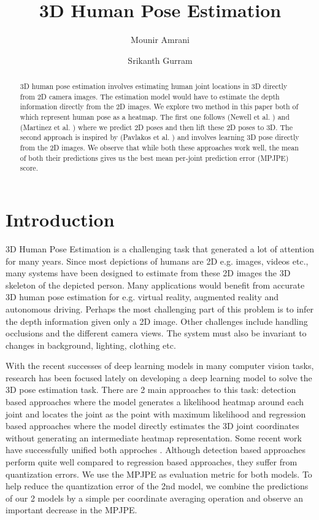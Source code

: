 \documentclass[sigconf]{acmart}
\begin{document}
\title{3D Human Pose Estimation}


\author{Mounir Amrani}\affiliation{}
\author{Srikanth Gurram}\affiliation{}

\begin{abstract}
3D human pose estimation involves estimating human joint locations in 3D directly from 2D camera images. The estimation model would have to estimate the depth information directly from the 2D images. We explore two method in this paper both of which represent human pose as a heatmap. The first one follows (Newell et al. \cite{newell}) and (Martinez et al. \cite{martinez}) where we predict 2D poses and then lift these 2D poses to 3D. The second approach is inspired by (Pavlakos et al. \cite{pavlakos}) and involves learning 3D pose directly from the 2D images. We observe that while both these approaches work well, the mean of both their predictions gives us the best mean per-joint prediction error (MPJPE) score.
\end{abstract}

\maketitle

\section{Introduction}
\quad 3D Human Pose Estimation is a challenging task that generated a lot of attention for many years. Since most depictions of humans are 2D e.g. images, videos etc., many systems have been designed to estimate from these 2D images the 3D skeleton of the depicted person. Many applications would benefit from accurate 3D human pose estimation for e.g. virtual reality, augmented reality and autonomous driving. Perhaps the most challenging part of this problem is to infer the depth information given only a 2D image. Other challenges include handling occlusions and the different camera views. The system must also be invariant to changes in background, lighting, clothing etc.

With the recent successes of deep learning models in many computer vision tasks, research has been focused lately on developing a deep learning model to solve the 3D pose estimation task. There are 2 main approaches to this task: detection based approaches \cite{pavlakos} where the model generates a likelihood heatmap around each joint and locates the joint as the point with maximum likelihood and regression based approaches \cite{li} where the model directly estimates the 3D joint coordinates without generating an intermediate heatmap representation. Some recent work have successfully unified both approches \cite{sun}. Although detection based approaches perform quite well compared to regression based approaches, they suffer from quantization errors. We use the MPJPE as evaluation metric for both models. To help reduce the quantization error of the 2nd model, we combine the predictions of our 2 models by a simple per coordinate averaging operation and observe an important decrease in the MPJPE.
\end{document}
